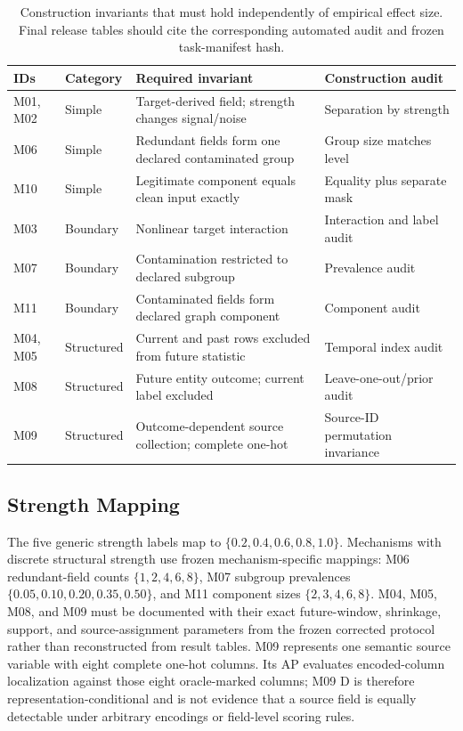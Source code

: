 \documentclass[letterpaper]{article}
\begin{document}
\begin{table}[t]
\centering
\small
\begin{tabular}{llll}
\toprule
IDs & Category & Required invariant & Construction audit \\
\midrule
M01, M02 & Simple & Target-derived field; strength changes signal/noise & Separation by strength \\
M06 & Simple & Redundant fields form one declared contaminated group & Group size matches level \\
M10 & Simple & Legitimate component equals clean input exactly & Equality plus separate mask \\
M03 & Boundary & Nonlinear target interaction & Interaction and label audit \\
M07 & Boundary & Contamination restricted to declared subgroup & Prevalence audit \\
M11 & Boundary & Contaminated fields form declared graph component & Component audit \\
M04, M05 & Structured & Current and past rows excluded from future statistic & Temporal index audit \\
M08 & Structured & Future entity outcome; current label excluded & Leave-one-out/prior audit \\
M09 & Structured & Outcome-dependent source collection; complete one-hot & Source-ID permutation invariance \\
\bottomrule
\end{tabular}
\caption{Construction invariants that must hold independently of empirical
effect size.  Final release tables should cite the corresponding automated
audit and frozen task-manifest hash.}
\label{tab:construction-invariants}
\end{table}

\subsection{Strength Mapping}
The five generic strength labels map to $\{0.2,0.4,0.6,0.8,1.0\}$.  Mechanisms
with discrete structural strength use frozen mechanism-specific mappings:
M06 redundant-field counts $\{1,2,4,6,8\}$, M07 subgroup prevalences
$\{0.05,0.10,0.20,0.35,0.50\}$, and M11 component sizes
$\{2,3,4,6,8\}$.  M04, M05, M08, and M09 must be documented with their exact
future-window, shrinkage, support, and source-assignment parameters from the
frozen corrected protocol rather than reconstructed from result tables.
M09 represents one semantic source variable with eight complete one-hot
columns.  Its AP evaluates encoded-column localization against those eight
oracle-marked columns; M09 D is therefore representation-conditional and is
not evidence that a source field is equally detectable under arbitrary
encodings or field-level scoring rules.
\end{document}
